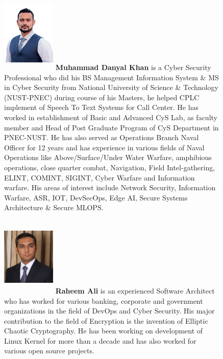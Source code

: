 \documentclass{article}
\begin{document}
\begin{figure}[h]
\includegraphics[width=1in,height=1.5in,clip,keepaspectratio]{img/Danyal.png}
\textbf{Muhammad Danyal Khan} is a Cyber Security Professional who did his BS Management Information System \& MS in Cyber Security from National University of Science \& Technology (NUST-PNEC) during course of his Masters, he helped CPLC implement of Speech To Text Systems for Call Center. He has worked in establishment of Basic and Advanced CyS Lab, as faculty member and Head of Post Graduate Program of CyS Department in PNEC-NUST. He has also served as Operations Branch Naval Officer for 12 years and has experience in various fields of Naval Operations like Above/Surface/Under Water Warfare, amphibious operations, close quarter combat, Navigation, Field Intel-gathering, ELINT, COMINT, SIGINT, Cyber Warfare and Information warfare. His areas of interest include Network Security, Information Warfare, ASR, IOT, DevSecOps, Edge AI, Secure Systems Architecture \& Secure MLOPS.
\end{figure}

\begin{figure}[h]
\includegraphics[width=1in,height=1.5in,clip,keepaspectratio]{img/raheemali.jpg}
\textbf{Raheem Ali} is an experienced Software Architect who has worked for various banking, corporate and government organizations in the field of DevOps and Cyber Security. His major contribution to the field of Encryption is the invention of Elliptic Chaotic Cryptography. He has been working on development of Linux Kernel for more than a decade and has also worked for various open source projects.
\end{figure}
\end{document}
